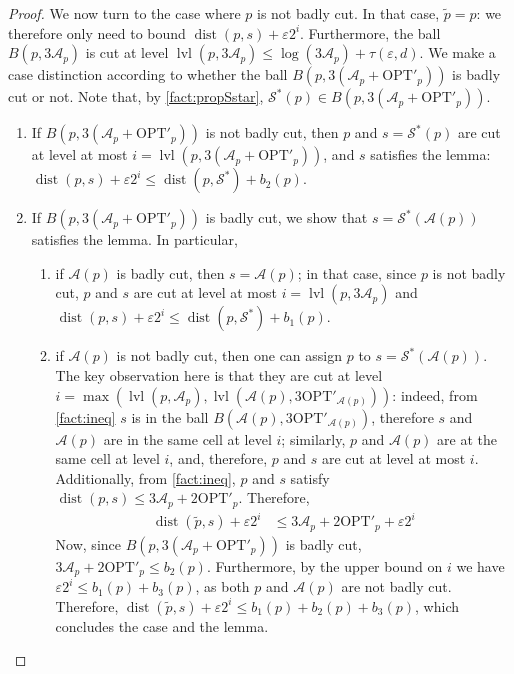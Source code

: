 \documentclass[11pt]{article}
\newcommand{\opt}{\text{OPT}}
\newcommand{\eps}{\varepsilon}
\renewcommand{\tilde}{\widetilde}
\newcommand{\calS}{\mathcal {S}}
\newcommand{\calL}{\mathcal{A}}
\newcommand{\offset}{\tau(\eps, d)}
\DeclareMathOperator{\dist}{dist}
\newcommand{\lpar}{\left(}
\newcommand{\rpar}{\right)}
\DeclareMathOperator{\level}{lvl}
\begin{document}
\begin{proof}
 We now turn to the case where $p$ is not badly cut. In that case, $\tilde p = p$: we therefore only need to bound $\dist( p, s) + \eps 2^i$. 
 Furthermore, the ball $B(p, 3\calL_p)$ is cut at level $\level(p, 3\calL_p) \leq \log(3\calL_p)+\offset$. 
We make a case distinction according to whether the ball $B(p, 3(\calL_p + \opt'_p))$  is badly cut or not. Note that, by \cref{fact:propSstar}, $ \calS^*(p) \in B(p, 3(\calL_p + \opt'_p))$.
 \begin{enumerate}
  \item If $B(p, 3(\calL_p + \opt'_p))$ is not badly cut, then $p$ and $s = \calS^*(p)$ are cut at level at most $i = \level(p, 3(\calL_p + \opt'_p))$, and $s$ satisfies the lemma: $\dist(p, s) + \eps 2^i \leq \dist(p, \calS^*) + b_2(p)$.
  \item If $B(p, 3(\calL_p + \opt'_p))$ is badly cut, we show that $s= \calS^*(\calL(p))$ satisfies the lemma. In particular,
  \begin{enumerate}
      \item if $\calL(p)$ is badly cut, then $s = \calL(p)$; in that case, since $p$ is not badly cut, $p$ and $s$ are cut at level at most $i = \level(p, 3\calL_p)$ and $\dist(p, s) + \eps 2^i \leq \dist(p, \calS^*) + b_1(p)$.
      \item if $\calL(p)$ is not badly cut, then one can assign $p$ to $s=\calS^*(\calL(p))$. The key observation here is that they are cut at level $i = \max\lpar \level(p, \calL_p), \level(\calL(p),  3\opt'_{\calL(p)}) \rpar$: indeed, from \cref{fact:ineq} $s$ is in the ball $B(\calL(p), 3\opt'_{\calL(p)})$, therefore $s$ and $\calL(p)$ are in the same cell at level $i$; similarly, $p$ and $\calL(p)$ are at the same cell at level $i$, and, therefore, $p$ and $s$ are cut at level at most $i$.  Additionally, from \cref{fact:ineq}, $p$ and $s$ satisfy $\dist(p, s) \leq 3\calL_p + 2\opt'_p$.    
 Therefore,
       \begin{align*}
           \dist(\tilde p, s) + \eps 2^i &\leq 
           3\calL_p + 2\opt'_p + \eps 2^i
       \end{align*}
    Now, since $B(p, 3(\calL_p + \opt'_p))$ is badly cut, $3\calL_p + 2\opt'_p \leq b_2(p)$. Furthermore, by the upper bound on $i$ we have $\eps 2^{i} \leq b_1(p) + b_3(p)$, as both $p$ and $\calL(p)$ are not badly cut. 
    Therefore, $\dist(\tilde p, s) + \eps 2^i \leq b_1(p)+ b_2(p) + b_3(p)$, which concludes the case and the lemma.
  \end{enumerate}
\end{enumerate}
%
\end{proof}
\end{document}
